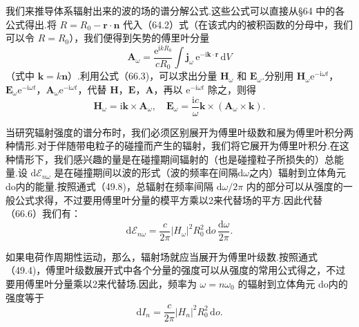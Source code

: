 我们来推导体系辐射出来的波的场的谱分解公式.这些公式可以直接从§64 中的各公式得出.将 $R=R_0-\boldsymbol{r}\cdot\boldsymbol{n}$ 代入（64.2）式（在该式内的被积函数的分母中，我们可以令 $R=R_0$），我们便得到矢势的傅里叶分量
\begin{equation}
  \boldsymbol{A}_\omega=\frac{\mathrm{e}^{\mathrm{i}kR_0}}{cR_0}\int\boldsymbol{j}_\omega\,\mathrm{e}^{-\mathrm{i}\boldsymbol{k}\cdot\boldsymbol{r}}\,\mathrm{d}V
\end{equation}
（式中 $\boldsymbol{k}=k\boldsymbol{n}$）.利用公式（66.3)，可以求出分量 $\boldsymbol{H}_\omega$ 和 $\boldsymbol{E}_\omega$.分别用 $\boldsymbol{H}_\omega\mathrm{e}^{-\mathrm{i}\omega t}$，$\boldsymbol{E}_\omega\mathrm{e}^{-\mathrm{i}\omega t}$，$\boldsymbol{A}_\omega\mathrm{e}^{-\mathrm{i}\omega t}$，代替 $\boldsymbol{H}$，$\boldsymbol{E}$，$\boldsymbol{A}$，再以 $\mathrm{e}^{-\mathrm{i}\omega t}$ 除之，则得
\begin{equation}
  \boldsymbol{H}_\omega=\mathrm{i}\boldsymbol{k}\times\boldsymbol{A}_\omega,\quad
  \boldsymbol{E}_\omega=\frac{\mathrm{i}c}{\omega}\boldsymbol{k}\times(\boldsymbol{A}_\omega\times\boldsymbol{k}).
\end{equation}

当研究辐射强度的谱分布时，我们必须区别展开为傅里叶级数和展为傅里叶积分两种情形.对于伴随带电粒子的碰撞而产生的辐射，我们将它展开为傅里叶积分.在这种情形下，我们感兴趣的量是在碰撞期间辐射的（也是碰撞粒子所损失的）总能量.设 $\mathrm{d}\mathcal{E}_{n\omega}$ 是在碰撞期间以波的形式（波的频率在间隔$\mathrm{d}\omega$之内）辐射到立体角元 do内的能量.按照通式（49.8)，总辐射在频率间隔 $\mathrm{d}\omega/2\pi$ 内的部分可以从强度的一般公式求得，不过要用傅里叶分量的模平方乘以2来代替场的平方.因此代替（66.6）我们有：
\begin{equation}
  \mathrm{d}\mathcal{E}_{n\omega}=\frac{c}{2\pi}|H_\omega|^2R_0^2\,\mathrm{d}o\,\frac{\mathrm{d}\omega}{2\pi}.
\end{equation}

如果电荷作周期性运动，那么，辐射场就应当展开为傅里叶级数.按照通式（49.4)，傅里叶级数展开式中各个分量的强度可以从强度的常用公式得之，不过要用傅里叶分量乘以2来代替场.因此，频率为 $\omega=n\omega_0$ 的辐射到立体角元 do内的强度等于
\begin{equation}
  \mathrm{d}I_n=\frac{c}{2\pi}|H_n|^2R_0^2\,\mathrm{d}o.
\end{equation}

